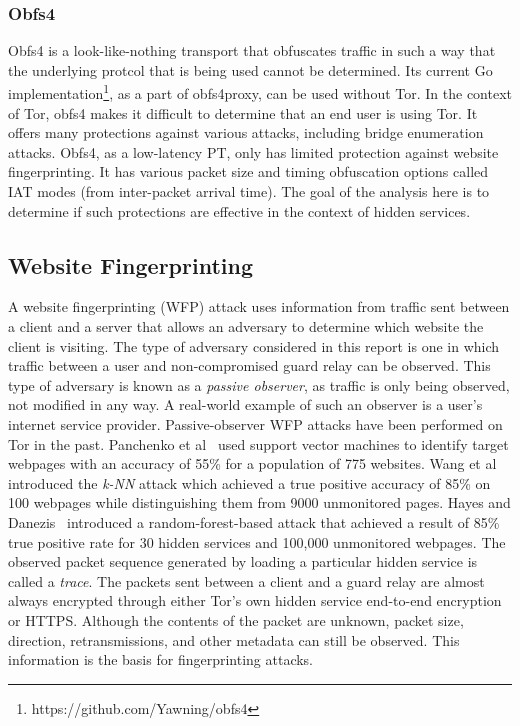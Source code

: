 \documentclass[11pt]{article}
\begin{document}
\subsubsection{Obfs4}
Obfs4 is a look-like-nothing transport that obfuscates traffic in such a way that the underlying protcol that is being used cannot be determined. Its current Go implementation\footnote{https://github.com/Yawning/obfs4}, as a part of obfs4proxy, can be used without Tor. In the context of Tor, obfs4 makes it difficult to determine that an end user is using Tor. It offers many protections against various attacks, including bridge enumeration attacks. Obfs4, as a low-latency PT, only has limited protection against website fingerprinting. It has various packet size and timing obfuscation options called IAT modes (from inter-packet arrival time). The goal of the analysis here is to determine if such protections are effective in the context of hidden services.

\subsection{Website Fingerprinting}
A website fingerprinting (WFP) attack uses information from traffic sent between a client and a server that allows an adversary to determine which website the client is visiting. The type of adversary considered in this report is one in which traffic between a user and non-compromised guard relay can be observed. This type of adversary is known as a \textit{passive observer}, as traffic is only being observed, not modified in any way. A real-world example of such an observer is a user's internet service provider. Passive-observer WFP attacks have been performed on Tor in the past. Panchenko et al~\cite{panchenko} used support vector machines to identify target webpages with an accuracy of 55\% for a population of 775 websites. Wang et al~\cite{wang} introduced the \textit{k-NN} attack which achieved a true positive accuracy of 85\% on 100 webpages while distinguishing them from 9000 unmonitored pages. Hayes and Danezis~\cite{hayes} introduced a random-forest-based attack that achieved a result of 85\% true positive rate for 30 hidden services and 100,000 unmonitored webpages.
The observed packet sequence generated by loading a particular hidden service is called a \textit{trace}. The packets sent between a client and a guard relay are almost always encrypted through either Tor's own hidden service end-to-end encryption or HTTPS. Although the contents of the packet are unknown, packet size, direction, retransmissions, and other metadata can still be observed. This information is the basis for fingerprinting attacks.
\end{document}
